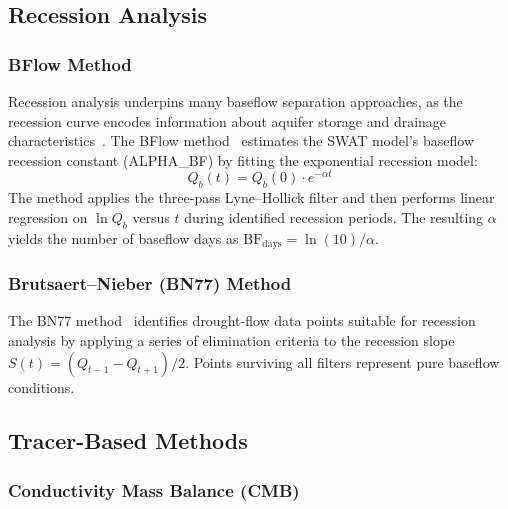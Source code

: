\documentclass[hydrology,article,submit,pdftex,moreauthors]{Definitions/mdpi}
\begin{document}
\subsection{Recession Analysis}
\label{sec:recession}

\subsubsection{BFlow Method}

Recession analysis underpins many baseflow separation approaches, as the recession curve encodes information about aquifer storage and drainage characteristics~\cite{Tallaksen1995,Wittenberg1999}. The BFlow method~\cite{Arnold1999} estimates the SWAT model's baseflow recession constant (ALPHA\_BF) by fitting the exponential recession model:
\begin{equation}
\label{eq:bflow}
Q_b(t) = Q_b(0) \cdot e^{-\alpha t}
\end{equation}
The method applies the three-pass Lyne--Hollick filter and then performs linear regression on $\ln Q_b$ versus $t$ during identified recession periods. The resulting $\alpha$ yields the number of baseflow days as $\mathrm{BF_{days}} = \ln(10)/\alpha$.

\subsubsection{Brutsaert--Nieber (BN77) Method}

The BN77 method~\cite{Cheng2016} identifies drought-flow data points suitable for recession analysis by applying a series of elimination criteria to the recession slope $S(t) = (Q_{t-1} - Q_{t+1})/2$. Points surviving all filters represent pure baseflow conditions.

\subsection{Tracer-Based Methods}
\label{sec:tracer}

\subsubsection{Conductivity Mass Balance (CMB)}
\end{document}
